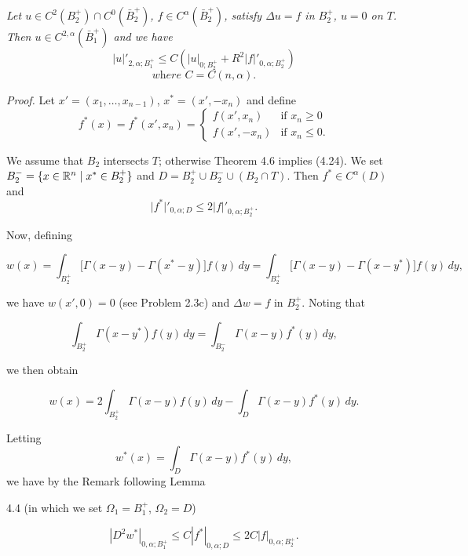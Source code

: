 \begin{theorem}\label{gt:thm-poisson-halfball-holder}
\textit{Let $u\in C^2(B_2^+)\cap C^0(\bar{B}_2^+)$, $f\in C^{\alpha}(\bar{B}_2^+)$, satisfy $\Delta u=f$ in $B_2^+$, $u=0$
on $T$. Then $u\in C^{2,\alpha}(\bar{B}_1^+)$ and we have}
\begin{equation}
\tag{4.24}
\lvert u\rvert'_{2,\alpha;B_1^+}\leq C(\lvert u\rvert_{0;B_2^+}+R^2\lvert f\rvert'_{0,\alpha;B_2^+})
\end{equation}
\[
\textit{where }C=C(n,\alpha).
\]

\textit{Proof.} Let $x'=(x_1,\ldots,x_{n-1})$, $x^*=(x',-x_n)$ and define
\[
f^*(x)=f^*(x',x_n)=
\begin{cases}
f(x',x_n) & \text{if }x_n\geq 0\\
f(x',-x_n) & \text{if }x_n\leq 0.
\end{cases}
\]

We assume that $B_2$ intersects $T$; otherwise Theorem 4.6 implies (4.24). We set
$B_2^-=\{x\in \mathbb{R}^n\mid x^*\in B_2^+\}$ and $D=B_2^+\cup B_2^-\cup (B_2\cap T)$. Then $f^*\in C^{\alpha}(D)$ and
\[
\lvert f^*\rvert'_{0,\alpha;D}\leq 2\lvert f\rvert'_{0,\alpha;B_2^+}.
\]

Now, defining


\begin{equation}
\tag{4.25}
w(x)=\int_{B_2^+}\bigl[\Gamma(x-y)-\Gamma(x^*-y)\bigr]f(y)\,dy
=\int_{B_2^+}\bigl[\Gamma(x-y)-\Gamma(x-y^*)\bigr]f(y)\,dy,
\end{equation}

we have $w(x',0)=0$ (see Problem 2.3c) and $\Delta w=f$ in $B_2^+$. Noting that

\[
\int_{B_2^+}\Gamma(x-y^*)f(y)\,dy=\int_{B_2^-}\Gamma(x-y)f^*(y)\,dy,
\]

we then obtain

\begin{equation}
w(x)=2\int_{B_2^+}\Gamma(x-y)f(y)\,dy-\int_D\Gamma(x-y)f^*(y)\,dy.
\end{equation}

Letting
\[
w^*(x)=\int_D\Gamma(x-y)f^*(y)\,dy,
\]
we have by the Remark following Lemma

4.4 (in which we set $\Omega_1=B_1^+$, $\Omega_2=D$)

\[
|D^2w^*|_{0,\alpha;B_1^+}\le C|f^*|_{0,\alpha;D}\le 2C|f|_{0,\alpha;B_2^+}.
\]


\end{theorem}
